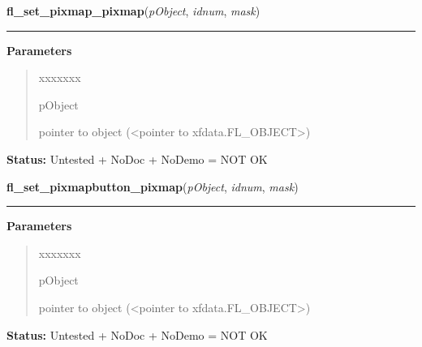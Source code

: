 \hspace{.8\funcindent}\begin{boxedminipage}{\funcwidth}

    \raggedright \textbf{fl\_set\_pixmap\_pixmap}(\textit{pObject}, \textit{idnum}, \textit{mask})

    \vspace{-1.5ex}

    \rule{\textwidth}{0.5\fboxrule}
\setlength{\parskip}{2ex}
\setlength{\parskip}{1ex}
      \textbf{Parameters}
      \vspace{-1ex}

      \begin{quote}
        \begin{Ventry}{xxxxxxx}

          \item[pObject]

          pointer to object ({\textless}pointer to 
          xfdata.FL\_OBJECT{\textgreater})

        \end{Ventry}

      \end{quote}

\textbf{Status:} Untested + NoDoc + NoDemo = NOT OK



    \end{boxedminipage}

    \label{xformslib:library:fl_set_pixmap_pixmap}

    \vspace{0.5ex}

\hspace{.8\funcindent}\begin{boxedminipage}{\funcwidth}

    \raggedright \textbf{fl\_set\_pixmapbutton\_pixmap}(\textit{pObject}, \textit{idnum}, \textit{mask})

    \vspace{-1.5ex}

    \rule{\textwidth}{0.5\fboxrule}
\setlength{\parskip}{2ex}
\setlength{\parskip}{1ex}
      \textbf{Parameters}
      \vspace{-1ex}

      \begin{quote}
        \begin{Ventry}{xxxxxxx}

          \item[pObject]

          pointer to object ({\textless}pointer to 
          xfdata.FL\_OBJECT{\textgreater})

        \end{Ventry}

      \end{quote}

\textbf{Status:} Untested + NoDoc + NoDemo = NOT OK



    \end{boxedminipage}

